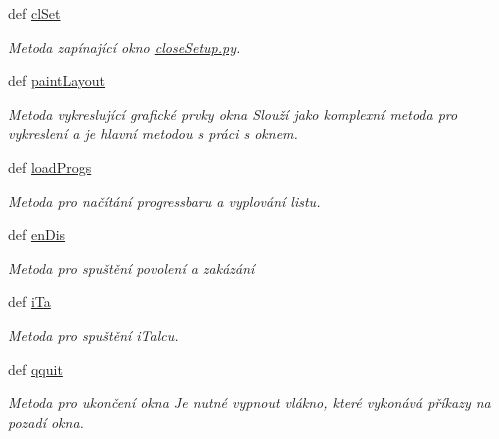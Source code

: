 \begin{DoxyCompactItemize}
def \hyperlink{classmnWindow_1_1App_a9c892833aaab9a00f5e04afd5cfc83bf}{cl\-Set}
\begin{DoxyCompactList}\small\item\em Metoda zapínající okno \hyperlink{closeSetup_8py}{close\-Setup.\-py}. \end{DoxyCompactList}\item 
def \hyperlink{classmnWindow_1_1App_a3a711688d2463a65d43a0a9dcc19276c}{paint\-Layout}
\begin{DoxyCompactList}\small\item\em Metoda vykreslující grafické prvky okna Slouží jako komplexní metoda pro vykreslení a je hlavní metodou s práci s oknem. \end{DoxyCompactList}\item 
def \hyperlink{classmnWindow_1_1App_aa07a9b47b0fc8969a970edff8ecc1b56}{load\-Progs}
\begin{DoxyCompactList}\small\item\em Metoda pro načítání progressbaru a vyplování listu. \end{DoxyCompactList}\item 
def \hyperlink{classmnWindow_1_1App_a406244c1526206699c931f64fd7e1789}{en\-Dis}
\begin{DoxyCompactList}\small\item\em Metoda pro spuštění povolení a zakázání \end{DoxyCompactList}\item 
def \hyperlink{classmnWindow_1_1App_a52d48174831c728d5ee3e7f0684aadb3}{i\-Ta}
\begin{DoxyCompactList}\small\item\em Metoda pro spuštění i\-Talcu. \end{DoxyCompactList}\item 
def \hyperlink{classmnWindow_1_1App_a6db9e81dd9a0225e260c43852f6bdcc4}{qquit}
\begin{DoxyCompactList}\small\item\em Metoda pro ukončení okna Je nutné vypnout vlákno, které vykonává příkazy na pozadí okna. \end{DoxyCompactList}\end{DoxyCompactItemize}
